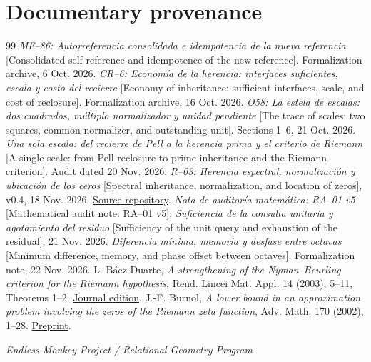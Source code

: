 \documentclass[11pt,a4paper]{article}
\theoremstyle{mine}
\theoremstyle{definition}
\begin{document}
\section*{Documentary provenance}
\begin{thebibliography}{99}\setlength{\itemsep}{3pt}
 \textit{MF--86: Autorreferencia consolidada e idempotencia de la nueva referencia} [Consolidated self-reference and idempotence of the new reference]. Formalization archive, 6 Oct. 2026.
 \textit{CR--6: Econom\'ia de la herencia: interfaces suficientes, escala y costo del recierre} [Economy of inheritance: sufficient interfaces, scale, and cost of reclosure]. Formalization archive, 16 Oct. 2026.
 \textit{O58: La estela de escalas: dos cuadrados, m\'ultiplo normalizador y unidad pendiente} [The trace of scales: two squares, common normalizer, and outstanding unit]. Sections 1--6, 21 Oct. 2026.
 \textit{Una sola escala: del recierre de Pell a la herencia prima y el criterio de Riemann} [A single scale: from Pell reclosure to prime inheritance and the Riemann criterion]. Audit dated 20 Nov. 2026.
 \textit{R--03: Herencia espectral, normalizaci\'on y ubicaci\'on de los ceros} [Spectral inheritance, normalization, and location of zeros], v0.4, 18 Nov. 2026. \href{https://github.com/EndlessMonkeyProyect/programa-geometria-relacional}{Source repository}.
 \textit{Nota de auditor\'ia matem\'atica: RA--01 v5} [Mathematical audit note: RA--01 v5]; \textit{Suficiencia de la consulta unitaria y agotamiento del residuo} [Sufficiency of the unit query and exhaustion of the residual]; 21 Nov. 2026.
 \textit{Diferencia m\'inima, memoria y desfase entre octavas} [Minimum difference, memory, and phase offset between octaves]. Formalization note, 22 Nov. 2026.
 L. B\'aez-Duarte, \textit{A strengthening of the Nyman--Beurling criterion for the Riemann hypothesis}, Rend. Lincei Mat. Appl. 14 (2003), 5--11, Theorems 1--2. \href{https://www.bdim.eu/item?id=RLIN_2003_9_14_1_5_0}{Journal edition}.
 J.-F. Burnol, \textit{A lower bound in an approximation problem involving the zeros of the Riemann zeta function}, Adv. Math. 170 (2002), 1--28. \href{https://arxiv.org/abs/math/0103058}{Preprint}.
\end{thebibliography}
\medskip\noindent\textit{Endless Monkey Project / Relational Geometry Program}
\end{document}
